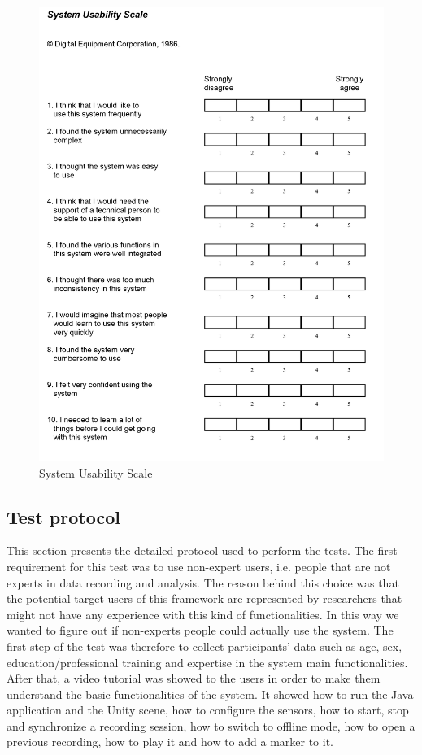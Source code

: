 \documentclass[binding=0.6cm,LaM]{sapthesis}
\begin{document}
\begin{figure}[p]
\centering
\includegraphics[scale=.92]{images/sus}
\caption{System Usability Scale}
\end{figure}

\subsection{Test protocol}
This section presents the detailed protocol used to perform the tests. The first requirement for this test was to use non-expert users, i.e. people that are not experts in data recording and analysis. The reason behind this choice was that the potential target users of this framework are represented by researchers that might not have any experience with this kind of functionalities. In this way we wanted to figure out if non-experts people could actually use the system. The first step of the test was therefore to collect participants' data such as age, sex, education/professional training and expertise in the system main functionalities. After that, a video tutorial was showed to the users in order to make them understand the basic functionalities of the system. It showed how to run the Java application and the Unity scene, how to configure the sensors, how to start, stop and synchronize a recording session, how to switch to offline mode, how to open a previous recording, how to play it and how to add a marker to it.
\end{document}
